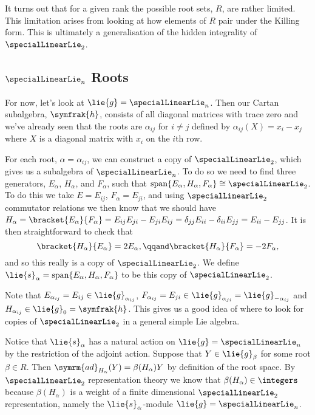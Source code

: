 \documentclass[fleqn]{NotesClass}
\newcommand{\isomorphic}{\cong}
\DeclareMathOperator{\Span}{span}
\newcommand{\ad}{\symrm{ad}}
\newcommand{\csa}{\symfrak{h}}
\begin{document}
    It turns out that for a given rank the possible root sets, \(R\), are rather limited.
    This limitation arises from looking at how elements of \(R\) pair under the Killing form.
    This is ultimately a generalisation of the hidden integrality of \(\specialLinearLie_2\).
    
    \subsection{\texorpdfstring{\(\specialLinearLie_n\)}{sln} Roots}
    For now, let's look at \(\lie{g} = \specialLinearLie_n\).
    Then our Cartan subalgebra, \(\csa\), consists of all diagonal matrices with trace zero and we've already seen that the roots are \(\alpha_{ij}\) for \(i \ne j\) defined by \(\alpha_{ij}(X) = x_i - x_j\) where \(X\) is a diagonal matrix with \(x_i\) on the \(i\)th row.
    
    For each root, \(\alpha = \alpha_{ij}\), we can construct a copy of \(\specialLinearLie_2\), which gives us a subalgebra of \(\specialLinearLie_n\).
    To do so we need to find three generators, \(E_\alpha\), \(H_\alpha\), and \(F_\alpha\), such that \(\Span\{E_\alpha, H_\alpha, F_\alpha\} \isomorphic \specialLinearLie_2\).
    To do this we take \(E = E_{ij}\), \(F_\alpha = E_{ji}\), and using \(\specialLinearLie_2\) commutator relations we then know that we should have \(H_\alpha = \bracket{E_\alpha}{F_\alpha} = E_{ij}E_{ji} - E_{ji}E_{ij} = \delta_{jj}E_{ii} - \delta_{ii}E_{jj} = E_{ii} - E_{jj}\).
    It is then straightforward to check that
    \begin{equation}
        \bracket{H_\alpha}{E_\alpha} = 2E_\alpha, \qqand \bracket{H_\alpha}{F_\alpha} = -2F_\alpha,
    \end{equation}
    and so this really is a copy of \(\specialLinearLie_2\).
    We define \(\lie{s}_\alpha = \Span\{E_\alpha, H_\alpha, F_\alpha\}\) to be this copy of \(\specialLinearLie_2\).
    
    Note that \(E_{\alpha_{ij}} = E_{ij} \in \lie{g}_{\alpha_{ij}}\), \(F_{\alpha_{ij}} = E_{ji} \in \lie{g}_{\alpha_{ji}} = \lie{g}_{-\alpha_{ij}}\) and \(H_{\alpha_{ij}} \in \lie{g}_0 = \csa\).
    This gives us a good idea of where to look for copies of \(\specialLinearLie_2\) in a general simple Lie algebra.
    
    Notice that \(\lie{s}_\alpha\) has a natural action on \(\lie{g} = \specialLinearLie_n\) by the restriction of the adjoint action.
    Suppose that \(Y \in \lie{g}_\beta\) for some root \(\beta \in R\).
    Then \(\ad_{H_\alpha}(Y) = \beta(H_\alpha)Y\) by definition of the root space.
    By \(\specialLinearLie_2\) representation theory we know that \(\beta(H_\alpha) \in \integers\) because \(\beta(H_\alpha)\) is a weight of a finite dimensional \(\specialLinearLie_2\) representation, namely the \(\lie{s}_\alpha\)-module \(\lie{g} = \specialLinearLie_n\).
    
    
    
    
    
    
    
    
    
    
    
    
%	
	
	\backmatter
	\renewcommand{\glossaryname}{Acronyms}
	\printglossary[acronym]
	\printindex
\end{document}
